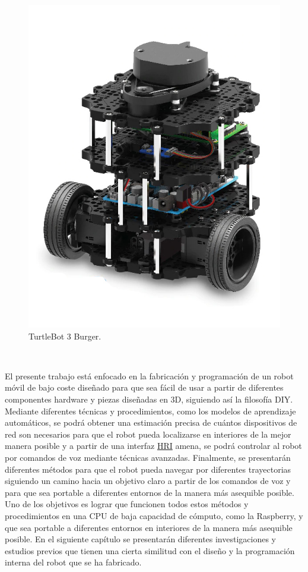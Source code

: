 \begin{figure} [H]
  \begin{center}
    \includegraphics[scale=0.25]{figs/turtlebot3burguer.jpg}
  \end{center}
  \caption{TurtleBot 3 Burger.}
  \label{fig:turtlebot}
\end{figure}\


El presente trabajo está enfocado en la fabricación y programación de un robot móvil de bajo coste diseñado para que sea fácil de usar a partir de diferentes componentes hardware y piezas diseñadas en 3D, siguiendo así la filosofía DIY. Mediante diferentes técnicas y procedimientos, como los modelos de aprendizaje automáticos, se podrá obtener una estimación precisa de cuántos dispositivos de red son necesarios para que el robot pueda localizarse en interiores de la mejor manera posible y a partir de una interfaz \hyperlink{HRI}{HRI} amena, se podrá controlar al robot por comandos de voz mediante técnicas avanzadas. Finalmente, se presentarán diferentes métodos para que el robot pueda navegar por diferentes trayectorias siguiendo un camino hacia un objetivo claro a partir de los comandos de voz y para que sea portable a diferentes entornos de la manera más asequible posible. Uno de los objetivos es lograr que funcionen todos estos métodos y procedimientos en una CPU de baja capacidad de cómputo, como la Raspberry, y que sea portable a diferentes entornos en interiores de la manera más asequible posible. En el siguiente capítulo se presentarán diferentes investigaciones y estudios previos que tienen una cierta similitud con el diseño y la programación interna del robot que se ha fabricado.

\vspace{15cm} %







